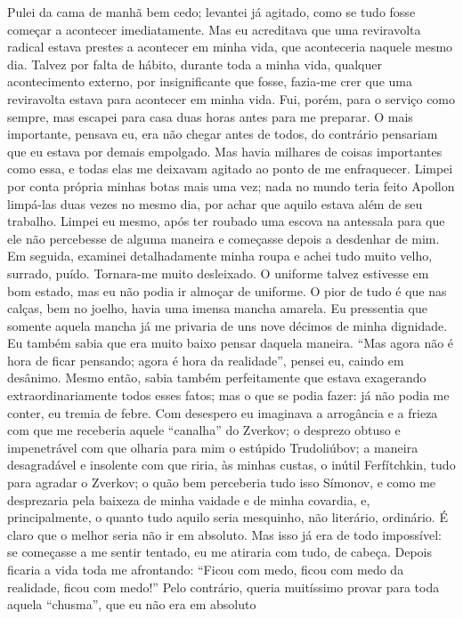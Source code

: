 Pulei da cama de manhã bem cedo; levantei já agitado, como se tudo fosse
começar a acontecer imediatamente. Mas eu acreditava que uma
reviravolta radical estava prestes a acontecer em minha vida, que
aconteceria naquele mesmo dia. Talvez por falta de hábito, durante toda
a minha vida, qualquer acontecimento externo, por insignificante que
fosse, fazia-me crer que uma reviravolta estava para acontecer em minha
vida. Fui, porém, para o serviço como sempre, mas escapei para casa
duas horas antes para me preparar. O mais importante, pensava eu, era
não chegar antes de todos, do contrário pensariam que eu estava por
demais empolgado. Mas havia milhares de coisas importantes como essa, e
todas elas me deixavam agitado ao ponto de me enfraquecer. Limpei por
conta própria minhas botas mais uma vez; nada no mundo teria feito
Apollon limpá-las duas vezes no mesmo dia, por achar que aquilo estava
além de seu trabalho. Limpei eu mesmo, após ter roubado uma escova na
antessala para que ele não percebesse de alguma maneira e começasse
depois a desdenhar de mim. Em seguida, examinei detalhadamente minha
roupa e achei tudo muito velho, surrado, puído. Tornara-me muito
desleixado. O uniforme talvez estivesse em bom estado, mas eu não podia
ir almoçar de uniforme. O pior de tudo é que nas calças, bem no joelho,
havia uma imensa mancha amarela. Eu pressentia que somente aquela
mancha já me privaria de uns nove décimos de minha dignidade. Eu também
sabia que era muito baixo pensar daquela maneira. “Mas agora não é hora
de ficar pensando; agora é hora da realidade”, pensei eu, caindo em
desânimo. Mesmo então, sabia também perfeitamente que estava exagerando
extraordinariamente todos esses fatos; mas o que se podia fazer: já não
podia me conter, eu tremia de febre. Com desespero eu imaginava a
arrogância e a frieza com que me receberia aquele “canalha” do Zverkov;
o desprezo obtuso e impenetrável com que olharia para mim o estúpido
Trudoliúbov; a maneira desagradável e insolente com que riria, às
minhas custas, o inútil Ferfítchkin, tudo para agradar o Zverkov; o
quão bem perceberia tudo isso Símonov, e como me desprezaria pela
baixeza de minha vaidade e de minha covardia, e, principalmente, o
quanto tudo aquilo seria mesquinho, não literário, ordinário. É claro
que o melhor seria não ir em absoluto. Mas isso já era de todo
impossível: se começasse a me sentir tentado, eu me atiraria com tudo,
de cabeça. Depois ficaria a vida toda me afrontando: “Ficou com medo,
ficou com medo da realidade, ficou com medo!” Pelo contrário, queria
muitíssimo provar para toda aquela “chusma”, que eu não era em absoluto
